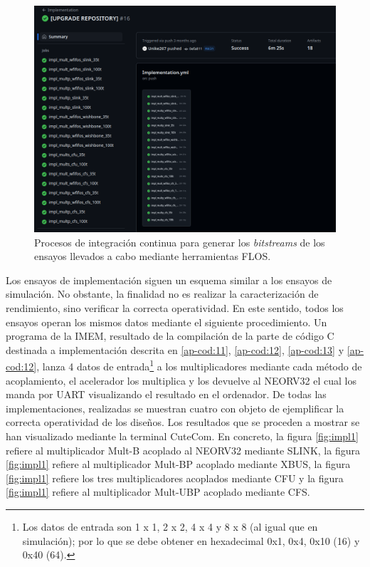\begin{figure}[H]
    \centering
    \includegraphics[width=14cm]{Figuras/impl-gh.png}
    \caption{Procesos de integración continua para generar los \textit{bitstreams} de los ensayos llevados a cabo mediante herramientas FLOS.}
    \label{fig:impl-gh}
\end{figure}

Los ensayos de implementación siguen un esquema similar a los ensayos de simulación.
No obstante, la finalidad no es realizar la caracterización de rendimiento, sino verificar la correcta operatividad.
En este sentido, todos los ensayos operan los mismos datos mediante el siguiente procedimiento.
Un programa de la IMEM, resultado de la compilación de la parte de código C destinada a implementación descrita en \ref{ap-cod:11}, \ref{ap-cod:12}, \ref{ap-cod:13} y \ref{ap-cod:12}, lanza 4 datos de entrada\footnote{Los datos de entrada son 1 x 1, 2 x 2, 4 x 4 y 8 x 8 (al igual que en simulación); por lo que se debe obtener en hexadecimal 0x1, 0x4, 0x10 (16) y 0x40 (64).} a los multiplicadores mediante cada método de acoplamiento, el acelerador los multiplica y los devuelve al NEORV32 el cual los manda por UART visualizando el resultado en el ordenador.
De todas las implementaciones, realizadas se muestran cuatro con objeto de ejemplificar la correcta operatividad de los diseños.
Los resultados que se proceden a mostrar se han visualizado mediante la terminal CuteCom.
En concreto, la figura \ref{fig:impl1} refiere al multiplicador Mult-B acoplado al NEORV32 mediante SLINK, la figura \ref{fig:impl1} refiere al multiplicador Mult-BP acoplado mediante XBUS, la figura \ref{fig:impl1} refiere los tres multiplicadores acoplados mediante CFU y la figura \ref{fig:impl1} refiere al multiplicador Mult-UBP acoplado mediante CFS.

